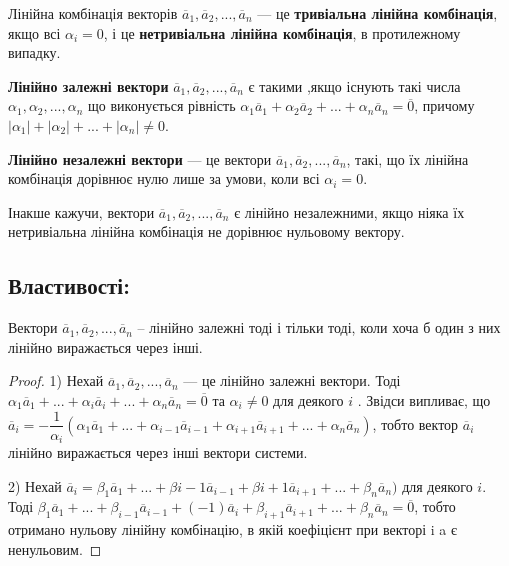 \begin{definition}
	Лінійна комбінація векторів $\overline{a}_1, \overline{a}_2, ..., \overline{a}_n$ --- це
	\textbf{тривіальна лінійна комбінація}, якщо всі $\alpha_i = 0$,
	і це \textbf{нетривіальна лінійна комбінація}, в протилежному випадку.
\end{definition}

\begin{definition}
	\textbf{Лінійно залежні вектори} $\overline{a}_1, \overline{a}_2, ...,\overline{a}_n$ є такими ,якщо існують
	такі числа $\alpha_1, \alpha_2, ..., \alpha_n$
	що виконується рівність $\alpha_1\overline{a}_1 + \alpha_2\overline{a}_2 + ... + \alpha_n\overline{a}_n = \overline{0}$,
	причому $|\alpha_1| + |\alpha_2| + ... + |\alpha_n| \neq 0$.
\end{definition}

\begin{definition}
	\textbf{Лінійно незалежні вектори} --- це вектори $\overline{a}_1, \overline{a}_2, ..., \overline{a}_n$, такі, що їх лінійна
	комбінація дорівнює нулю лише за умови, коли всі $\alpha_i = 0$.
\end{definition}

Інакше кажучи, вектори $\overline{a}_1, \overline{a}_2, ..., \overline{a}_n$ є лінійно незалежними, якщо ніяка їх
нетривіальна лінійна комбінація не дорівнює нульовому вектору. 

\subsection*{Властивості:}

\begin{claim}
	Вектори $\overline{a}_1, \overline{a}_2, ..., \overline{a}_n$ – лінійно залежні тоді і тільки тоді, коли хоча б
	один з них лінійно виражається через інші. 
\end{claim}
\begin{proof}
	1) Нехай $\overline{a}_1, \overline{a}_2, ..., \overline{a}_n$ --- це лінійно залежні вектори. Тоді
    $\alpha_1\overline{a}_1 + ... + \alpha_i\overline{a}_i + ... + \alpha_n\overline{a}_n = \overline{0}$ та $\alpha_i \neq 0$ для деякого $i$ . Звідси випливає, що
	$\overline{a}_i = -\dfrac{1}{\alpha_i}(\alpha_1\overline{a}_1 + ... + \alpha_{i-1}\overline{a}_{i-1} + \alpha_{i+1}\overline{a}_{i+1} + ... + \alpha_n\overline{a}_n)$, тобто вектор $\overline{a}_i$ лінійно
	виражається через інші вектори системи.
	
	2) Нехай $\overline{a}_i = \beta_1\overline{a}_1 + ... + \beta{i-1}\overline{a}_{i-1} + \beta{i+1}\overline{a}_{i+1} + ... + \beta_n\overline{a}_n)$ для деякого $i$. Тоді
	$\beta_1\overline{a}_1 + ... + \beta_{i-1}\overline{a}_{i-1} + (-1)\overline{a}_{i} + \beta_{i+1}\overline{a}_{i+1} + ... + \beta_{n}\overline{a}_{n} = \overline{0}$, тобто отримано нульову
	лінійну комбінацію, в якій коефіцієнт при векторі i a є ненульовим. 
\end{proof}

